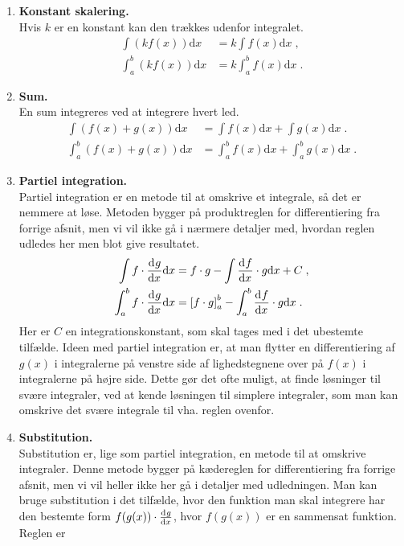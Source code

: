 \begin{enumerate}
	\item\label{itm:d-skalering} \textbf{Konstant skalering.}\\
	Hvis $k$ er en konstant kan den trækkes udenfor integralet.
	\begin{align*}
	\int(k f(x))\text{d}x &= k  \int f(x) \text{d}x \; , \\
	\int_a^b (k f(x)) \text{d}x &= k \int_a^b f(x) \text{d}x \; .
	\end{align*}
	\item\label{itm:d-sum} \textbf{Sum.}\\
	En sum integreres ved at integrere hvert led.
	\begin{align*}
	\int(f(x)+g(x))\text{d}x &= \int f(x) \text{d}x + \int g(x) \text{d}x \; . \\
	\int_a^b (f(x)+g(x))\text{d}x &= \int_a^b f(x) \text{d}x + \int_a^b g(x) \text{d}x \; .
	\end{align*}
	\item\label{itm:d-produkt} \textbf{Partiel integration.}\\
	Partiel integration er en metode til at omskrive et integrale, så det er nemmere at løse. Metoden bygger på produktreglen for differentiering fra forrige afsnit, men vi vil ikke gå i nærmere detaljer med, hvordan reglen udledes her men blot give resultatet.
	\begin{align*}
	\int f \cdot \dif{x}{g} \text{d}x &= f \cdot g - \int \dif{x}{f} \cdot g \text{d}x + C \; , \\
	\int_a^b f \cdot \dif{x}{g} \text{d}x &= \left[ f \cdot g \right]_a^b - \int_a^b \dif{x}{f} \cdot g \text{d}x \; .
	\end{align*}
	Her er $C$ en integrationskonstant, som skal tages med i det ubestemte tilfælde. Ideen med partiel integration er, at man flytter en differentiering af $g(x)$ i integralerne på venstre side af lighedstegnene over på $f(x)$ i integralerne på højre side. Dette gør det ofte muligt, at finde løsninger til svære integraler, ved at kende løsningen til simplere integraler, som man kan omskrive det svære integrale til vha. reglen ovenfor.
	\item\label{itm:d-kvotient} \textbf{Substitution.}\\
	Substitution er, lige som partiel integration, en metode til at omskrive integraler. Denne metode bygger på kædereglen for differentiering fra forrige afsnit, men vi vil heller ikke her gå i detaljer med udledningen. Man kan bruge substitution i det tilfælde, hvor den funktion man skal integrere har den bestemte form $f( g(x) ) \cdot \dif{x}{g}$, hvor $f(g(x))$ er en sammensat funktion. Reglen er

\end{enumerate}
